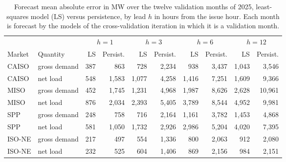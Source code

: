 \documentclass{UNCC-thesis}
\begin{document}
\begin{table}[htbp]
  \centering
  \footnotesize
  \caption[Forecast mean absolute error in MW, validation months of 2025]{Forecast mean absolute
  error in MW over the twelve validation months of 2025, least-squares model (LS) versus
  persistence, by lead \(h\) in hours from the issue hour. Each month is forecast by the models
  of the cross-validation iteration in which it is a validation month.}
  \label{tab:forecast-accuracy-cv}
  \setlength{\tabcolsep}{4pt}
  \begin{tabular}{@{}llrrrrrrrr@{}}
    \toprule
    & & \multicolumn{2}{c}{\(h=1\)} & \multicolumn{2}{c}{\(h=3\)}
        & \multicolumn{2}{c}{\(h=6\)} & \multicolumn{2}{c}{\(h=12\)} \\
    \cmidrule(lr){3-4}\cmidrule(lr){5-6}\cmidrule(lr){7-8}\cmidrule(l){9-10}
    Market & Quantity & LS & Persist. & LS & Persist.
                & LS & Persist. & LS & Persist. \\
    \midrule
    CAISO          & gross demand &   387 &   863 &   728 & 2,234 &   938 & 3,437 & 1,043 &  3,546 \\
    CAISO          & net load     &   548 & 1,583 & 1,077 & 4,258 & 1,416 & 7,251 & 1,609 &  9,366 \\
    MISO           & gross demand &   452 & 1,745 & 1,231 & 4,968 & 1,987 & 8,626 & 2,628 & 10,961 \\
    MISO           & net load     &   876 & 2,034 & 2,393 & 5,405 & 3,789 & 8,544 & 4,952 &  9,981 \\
    SPP            & gross demand &   248 &   758 &   716 & 2,164 & 1,161 & 3,782 & 1,453 &  4,868 \\
    SPP            & net load     &   581 & 1,050 & 1,732 & 2,926 & 2,986 & 5,204 & 4,020 &  7,395 \\
    ISO-NE         & gross demand &   217 &   497 &   554 & 1,336 &   800 & 2,063 &   912 &  2,080 \\
    ISO-NE         & net load     &   232 &   525 &   604 & 1,406 &   869 & 2,156 &   984 &  2,151 \\
    \bottomrule
  \end{tabular}
\end{table}
\end{document}
